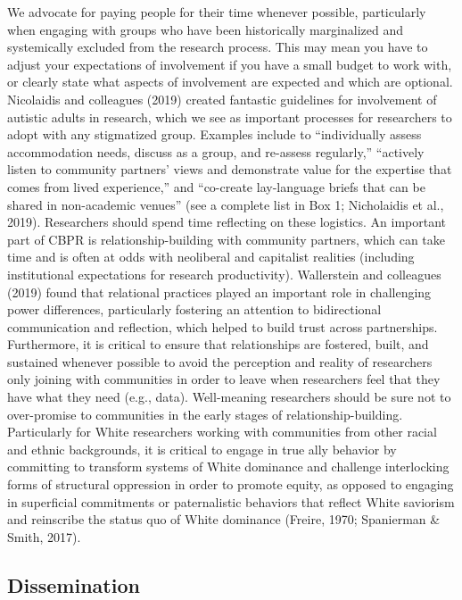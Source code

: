 \documentclass[
  11pt,
]{book}
\begin{document}
We advocate for paying people for their time whenever possible, particularly when engaging with groups who have been historically marginalized and systemically excluded from the research process. This may mean you have to adjust your expectations of involvement if you have a small budget to work with, or clearly state what aspects of involvement are expected and which are optional. Nicolaidis and colleagues (2019) created fantastic guidelines for involvement of autistic adults in research, which we see as important processes for researchers to adopt with any stigmatized group. Examples include to ``individually assess accommodation needs, discuss as a group, and re-assess regularly,'' ``actively listen to community partners' views and demonstrate value for the expertise that comes from lived experience,'' and ``co-create lay-language briefs that can be shared in non-academic venues'' (see a complete list in Box 1; Nicholaidis et al., 2019). Researchers should spend time reflecting on these logistics. An important part of CBPR is relationship-building with community partners, which can take time and is often at odds with neoliberal and capitalist realities (including institutional expectations for research productivity). Wallerstein and colleagues (2019) found that relational practices played an important role in challenging power differences, particularly fostering an attention to bidirectional communication and reflection, which helped to build trust across partnerships. Furthermore, it is critical to ensure that relationships are fostered, built, and sustained whenever possible to avoid the perception and reality of researchers only joining with communities in order to leave when researchers feel that they have what they need (e.g., data). Well-meaning researchers should be sure not to over-promise to communities in the early stages of relationship-building. Particularly for White researchers working with communities from other racial and ethnic backgrounds, it is critical to engage in true ally behavior by committing to transform systems of White dominance and challenge interlocking forms of structural oppression in order to promote equity, as opposed to engaging in superficial commitments or paternalistic behaviors that reflect White saviorism and reinscribe the status quo of White dominance (Freire, 1970; Spanierman \& Smith, 2017).

\subsection{Dissemination}\label{dissemination}
\end{document}
